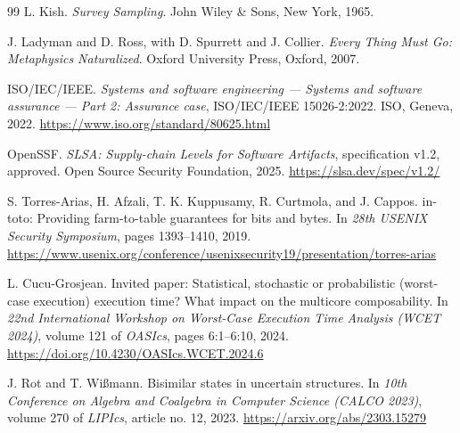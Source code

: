 \begin{thebibliography}{99}
L. Kish.
\newblock \emph{Survey Sampling}.
\newblock John Wiley \& Sons, New York, 1965.

J. Ladyman and D. Ross, with D. Spurrett and J. Collier.
\newblock \emph{Every Thing Must Go: Metaphysics Naturalized}.
\newblock Oxford University Press, Oxford, 2007.

ISO/IEC/IEEE.
\newblock \emph{Systems and software engineering --- Systems and software assurance
--- Part 2: Assurance case}, ISO/IEC/IEEE 15026-2:2022.
\newblock ISO, Geneva, 2022.
\newblock \url{https://www.iso.org/standard/80625.html}

OpenSSF.
\newblock \emph{SLSA: Supply-chain Levels for Software Artifacts}, specification
v1.2, approved.
\newblock Open Source Security Foundation, 2025.
\newblock \url{https://slsa.dev/spec/v1.2/}

S. Torres-Arias, H. Afzali, T. K. Kuppusamy, R. Curtmola, and J. Cappos.
\newblock in-toto: Providing farm-to-table guarantees for bits and bytes.
\newblock In \emph{28th USENIX Security Symposium}, pages 1393--1410, 2019.
\newblock \url{https://www.usenix.org/conference/usenixsecurity19/presentation/torres-arias}

L. Cucu-Grosjean.
\newblock Invited paper: Statistical, stochastic or probabilistic (worst-case
execution) execution time? What impact on the multicore composability.
\newblock In \emph{22nd International Workshop on Worst-Case Execution Time
Analysis (WCET 2024)}, volume 121 of \emph{OASIcs}, pages 6:1--6:10, 2024.
\newblock \url{https://doi.org/10.4230/OASIcs.WCET.2024.6}


J. Rot and T. Wi{\ss}mann.
\newblock Bisimilar states in uncertain structures.
\newblock In \emph{10th Conference on Algebra and Coalgebra in Computer Science
(CALCO 2023)}, volume 270 of \emph{LIPIcs}, article no. 12, 2023.
\newblock \url{https://arxiv.org/abs/2303.15279}


\end{thebibliography}
